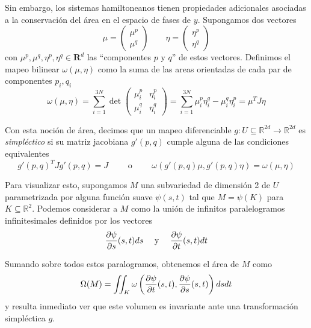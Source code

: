 Sin embargo, los sistemas hamiltoneanos tienen propiedades adicionales asociadas a la conservación del área en el espacio de fases de $y$.
Supongamos dos vectores
\[ \mu = \begin{pmatrix} \mu^p\\ \mu^q \end{pmatrix} \qquad \eta = \begin{pmatrix} \eta^p\\ \eta^q \end{pmatrix}  \]
con $\mu^p, \mu^q, \eta^p, \eta^q\in\mathbf{R}^{d}$ las ``componentes $p$ y $q$'' de estos vectores.
Definimos el mapeo bilinear $\omega(\mu,\eta)$ como la suma de las areas orientadas de cada par de componentes $p_i,q_i$
\begin{equation}
 \omega(\mu, \eta) = \sum_{i=1}^{3N} \det \begin{pmatrix} \mu^p_i & \eta^p_i \\ \mu^q_i & \eta^q_i \end{pmatrix} = \sum_{i=1}^{3N} \mu^p_i\eta^q_i - \mu^q_i\eta^p_i = \mu^T J \eta
\end{equation}

Con esta noción de área, decimos que un mapeo diferenciable $g:U\subseteq\mathbb{R}^{2d}\to\mathbb{R}^{2d}$ es \textit{simpléctico} si su matriz jacobiana $g'(p,q)$ cumple alguna de las condiciones
equivalentes \[ g'(p,q)^T J g'(p,q) = J \qquad \text{ o } \qquad \omega(g'(p,q)\mu, g'(p,q)\eta) = \omega(\mu, \eta) \]

Para visualizar esto, supongamos $M$ una subvariedad de dimensión 2 de $U$ parametrizada por alguna función suave $\psi(s,t)$ tal que $M=\psi(K)$ para $K\subseteq\mathbb{R}^2$.
Podemos considerar a $M$ como la unión de infinitos paralelogramos infinitesimales definidos por los vectores
\[ \frac{\partial\psi}{\partial s}(s,t)ds \quad \text{ y } \quad \frac{\partial\psi}{\partial t}(s,t)dt \]

Sumando sobre todos estos paralogramos, obtenemos el área de $M$ como
\begin{equation}{\label{eq:area_orien_simp}}
 \Omega(M) = \iint_K \omega\left(\frac{\partial\psi}{\partial t}(s,t), \frac{\partial\psi}{\partial s}(s,t)\right) ds dt
\end{equation}
y resulta inmediato ver que este volumen es invariante ante una transformación simpléctica $g$.

